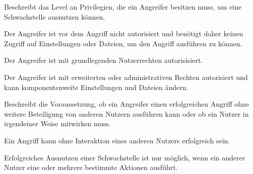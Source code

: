 \begin{description}[itemsep=0.7em,align=left,labelindent=0pt,leftmargin=0pt]
\begin{description}[noitemsep,align=left,labelindent=0.7cm,leftmargin=0.7cm]
            \end{description}
        \item [Privileges Required:] Beschreibt das Level an Privilegien, die ein Angreifer besitzen muss, um eine Schwachstelle ausnutzen können.
            \begin{description}[noitemsep,align=left,labelindent=0.7cm,leftmargin=0.7cm]
                \item [None:] Der Angreifer ist vor dem Angriff nicht autorisiert und benötigt daher keinen Zugriff auf Einstellungen oder Dateien, um den Angriff ausführen zu können.
                \item [Low:] Der Angreifer ist mit grundlegenden Nutzerrechten autorisisiert.
                \item [High:] Der Angreifer ist mit erweiterten oder administrativen Rechten autorisiert und kann komponentenweite Einstellungen und Dateien ändern.
            \end{description}
        \item [User Interaction:] Beschreibt die Voraussetzung, ob ein Angreifer einen erfolgreichen Angriff ohne weitere Beteiligung von anderen Nutzern ausführen kann oder ob ein Nutzer in irgendeiner Weise mitwirken muss.
            \begin{description}[noitemsep,align=left,labelindent=0.7cm,leftmargin=0.7cm]
                \item [None:] Ein Angriff kann ohne Interaktion eines anderen Nutzers erfolgreich sein.
                \item [Required:] Erfolgreiches Ausnutzen einer Schwachstelle ist nur möglich, wenn ein anderer Nutzer eine oder mehrere bestimmte Aktionen ausführt.
            \end{description}
    \end{description}
    
